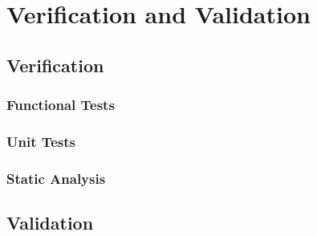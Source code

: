 \section{Verification and Validation}

\subsection{Verification}


\subsubsection{Functional Tests}


\subsubsection{Unit Tests}


\subsubsection{Static Analysis}


\subsection{Validation}

